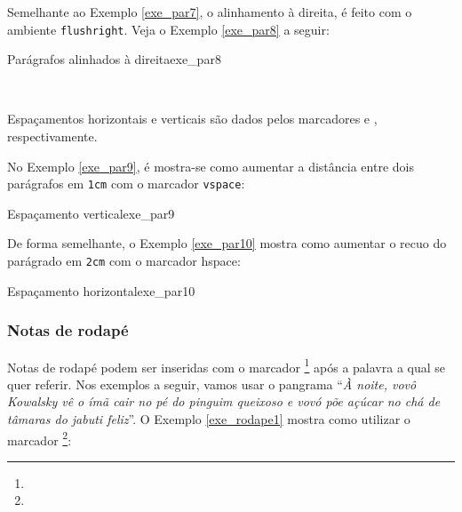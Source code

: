 Semelhante ao Exemplo \ref{exe_par7}, o alinhamento à direita, é feito com o ambiente {\tt flushright}. Veja o Exemplo \ref{exe_par8} a seguir:

\begin{texexptitled}[breakable,enhanced,middle=2mm]{Parágrafos alinhados à direita}{exe_par8}
\begin{flushright}
\lipsumsentence[21-22] \\ 
\lipsumsentence[23-24]
\end{flushright}
\end{texexptitled}

Espaçamentos horizontais e verticais são dados pelos marcadores \texttt{\vspace{}} e \texttt{\hspace{}}, respectivamente.


No Exemplo \ref{exe_par9}, é mostra-se como aumentar a distância entre dois parágrafos em {\tt 1cm} com o marcador {\tt vspace}:

\begin{texexptitled}[breakable,enhanced,middle=2mm]{Espaçamento vertical}{exe_par9}
\lipsumsentence[21-22] 
\vspace{1cm}
\lipsumsentence[23-27]
\end{texexptitled}

De forma semelhante, o Exemplo \ref{exe_par10} mostra como aumentar o recuo do parágrado em {\tt 2cm} com o marcador {hspace}:

\begin{texexptitled}[breakable,enhanced,middle=2mm]{Espaçamento horizontal}{exe_par10}
\hspace{2cm}\lipsumsentence[28-29] \\ 
\lipsumsentence[30-31]
\end{texexptitled}


\subsubsection*{Notas de rodapé}
\label{sec:notas_rodape}

Notas de rodapé podem ser inseridas com o marcador \texttt{\footnote{}} após a palavra a qual se quer referir. Nos exemplos a seguir, vamos usar o pangrama\footnotemark{} ``\textit{À noite, vovô Kowalsky vê o ímã cair no pé do pinguim queixoso e vovó põe açúcar no chá de tâmaras do jabuti feliz\footnotemark{}}''. O Exemplo \ref{exe_rodape1} mostra como utilizar o marcador \texttt{\footnote{}}:

